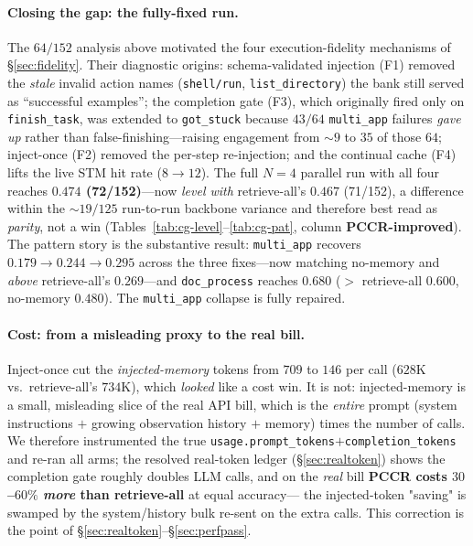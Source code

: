 \documentclass[10pt,twocolumn]{article}
\newcommand{\code}[1]{\texttt{\small #1}}
\begin{document}
\paragraph{Closing the gap: the fully-fixed run.} The $64/152$ analysis above motivated the four
execution-fidelity mechanisms of \S\ref{sec:fidelity}. Their diagnostic origins: schema-validated
injection (F1) removed the \emph{stale} invalid action names (\code{shell/run},
\code{list\_directory}) the bank still served as ``successful examples''; the completion gate (F3),
which originally fired only on \code{finish\_task}, was extended to \code{got\_stuck} because $43/64$
\code{multi\_app} failures \emph{gave up} rather than false-finishing---raising engagement from
${\sim}9$ to $35$ of those $64$; inject-once (F2) removed the per-step re-injection; and the continual
cache (F4) lifts the live STM hit rate ($8\to12$). The full $N{=}4$ parallel run with all four reaches
\textbf{$0.474$ (72/152)}---now \emph{level with} retrieve-all's $0.467$ (71/152), a difference within
the $\sim$$19/125$ run-to-run backbone variance and therefore best read as \emph{parity}, not a win
(Tables~\ref{tab:cg-level}--\ref{tab:cg-pat}, column \textbf{PCCR-improved}). The pattern story is the
substantive result: \code{multi\_app} recovers
$0.179{\to}0.244{\to}\mathbf{0.295}$ across the three fixes---now matching no-memory and \emph{above}
retrieve-all's $0.269$---and \code{doc\_process} reaches $\mathbf{0.680}$ ($>$ retrieve-all $0.600$,
no-memory $0.480$). The \code{multi\_app} collapse is fully repaired.

\paragraph{Cost: from a misleading proxy to the real bill.} Inject-once cut the
\emph{injected-memory} tokens from $709$ to $146$ per call ($628$K vs.\ retrieve-all's $734$K),
which \emph{looked} like a cost win. It is not: injected-memory is a small, misleading slice of the
real API bill, which is the \emph{entire} prompt (system instructions $+$ growing observation history
$+$ memory) times the number of calls. We therefore instrumented the true
\texttt{usage.prompt\_tokens}$+$\texttt{completion\_tokens} and re-ran all arms; the resolved
real-token ledger (\S\ref{sec:realtoken}) shows the completion gate roughly doubles LLM calls, and on
the \emph{real} bill \textbf{PCCR costs $30$--$60\%$ \emph{more} than retrieve-all} at equal accuracy---
the injected-token "saving" is swamped by the system/history bulk re-sent on the extra calls. This
correction is the point of \S\ref{sec:realtoken}--\S\ref{sec:perfpass}.
\end{document}
